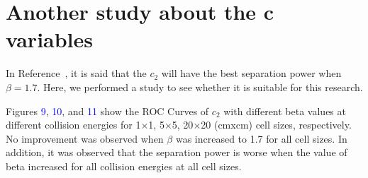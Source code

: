 \section*{Another study about the c variables}


In Reference~\cite{Larkoski:2013eya}, it is said that the $c_2$ will have the best separation power when $\beta = 1.7$. Here, we performed a study to see whether it is suitable for this research.

Figures \textcolor{blue}{9}, \textcolor{blue}{10}, and \textcolor{blue}{11} show the ROC Curves of $c_2$ with different beta values at different collision energies for 1$\times$1, 5$\times$5, 20$\times$20 (cmxcm) cell sizes, respectively. No improvement was observed when $\beta$ was increased to 1.7 for all cell sizes. In addition, it was observed that the separation power is worse when the value of beta increased for all collision energies at all cell sizes.
\label{sec:c_variables_study}

